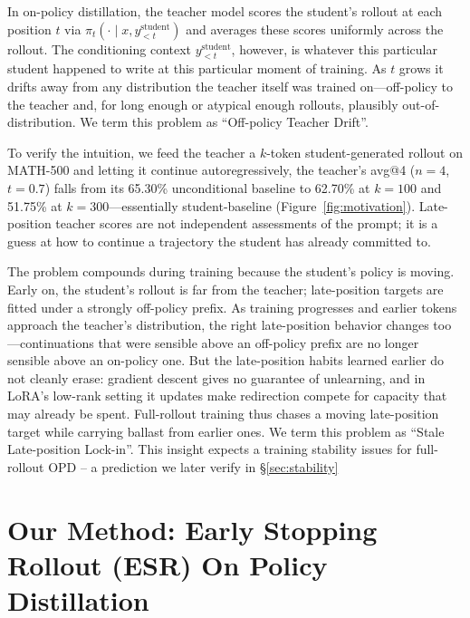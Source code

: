 \documentclass{article}
\newcommand{\methodfull}{Early Stopping Rollout}
\begin{document}
In on-policy distillation, the teacher model scores the student's rollout at each position $t$ via $\pi_t(\cdot \mid x, y_{<t}^{\text{student}})$ and averages these scores uniformly across the rollout. The conditioning context $y_{<t}^{\text{student}}$, however, is whatever this particular student happened to write at this particular moment of training. As $t$ grows it drifts away from any distribution the teacher itself was trained on---off-policy to the teacher and, for long enough or atypical enough rollouts, plausibly out-of-distribution. We term this problem as ``Off-policy Teacher Drift''.  

To verify the intuition, we feed the teacher a $k$-token student-generated rollout on MATH-500 and letting it continue autoregressively, the teacher's avg@4 ($n{=}4$, $t{=}0.7$) falls from its 65.30\% unconditional baseline to 62.70\% at $k{=}100$ and 51.75\% at $k{=}300$---essentially student-baseline (Figure~\ref{fig:motivation}). Late-position teacher scores are not independent assessments of the prompt; it is a guess at how to continue a trajectory the student has already committed to. 
  
The problem compounds during training because the student's policy is moving. Early on, the student's rollout is far from the teacher; late-position targets are fitted under a strongly off-policy prefix. As training progresses and earlier tokens approach the teacher's distribution, the right late-position behavior changes too---continuations that were sensible above an off-policy prefix are no longer sensible above an on-policy one. But the late-position habits learned earlier do not cleanly erase: gradient descent gives no guarantee of unlearning, and in LoRA's low-rank setting it updates make redirection compete for capacity that may already be spent. Full-rollout training thus chases a moving late-position target while carrying ballast from earlier ones. We term this problem as ``Stale Late-position Lock-in''. This insight expects a training stability issues for full-rollout OPD -- a prediction we later verify in \S\ref{sec:stability}




\section{Our Method: \methodfull{} (ESR) On Policy Distillation}
\label{sec:method}
\end{document}
